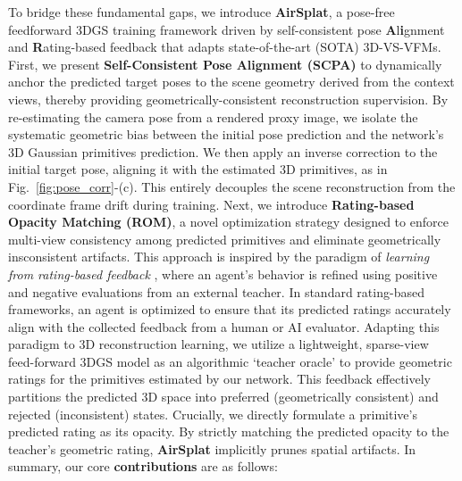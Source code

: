 To bridge these fundamental gaps, we introduce \textbf{AirSplat}, a pose-free feedforward 3DGS training framework driven by self-consistent pose \textbf{A}l\textbf{i}gnment and \textbf{R}ating-based feedback that adapts state-of-the-art (SOTA) 3D-VS-VFMs. 
First, we present \textbf{Self-Consistent Pose Alignment (SCPA)} to dynamically anchor the predicted target poses to the scene geometry derived from the context views, thereby providing geometrically-consistent reconstruction supervision. 
By re-estimating the camera pose from a rendered proxy image, we isolate the systematic geometric bias between the initial pose prediction and the network's 3D Gaussian primitives prediction. We then apply an inverse correction to the initial target pose, aligning it with the estimated 3D primitives, as in Fig.~\ref{fig:pose_corr}-(c). This entirely decouples the scene reconstruction from the coordinate frame drift during training. 
Next, we introduce \textbf{Rating-based Opacity Matching (ROM)}, a novel optimization strategy designed to enforce multi-view consistency among predicted primitives and eliminate geometrically insconsistent artifacts. This approach is inspired by the paradigm of \textit{learning from rating-based feedback} \cite{10.5555/3305890.3305917, arumugam2019deep, white2024rating, luu2025enhancing}, where an agent's behavior is refined using positive and negative evaluations from an external teacher. In standard rating-based frameworks, an agent is optimized to ensure that its predicted ratings accurately align with the collected feedback from a human or AI evaluator. Adapting this paradigm to 3D reconstruction learning, we utilize a lightweight, sparse-view feed-forward 3DGS model as an algorithmic `teacher oracle' to provide geometric ratings for the primitives estimated by our network. This feedback effectively partitions the predicted 3D space into preferred (geometrically consistent) and rejected (inconsistent) states. Crucially, we directly formulate a primitive's predicted rating as its opacity. By strictly matching the predicted opacity to the teacher's geometric rating, \textbf{AirSplat} implicitly prunes spatial artifacts. 
In summary, our core \textbf{contributions} are as follows:
